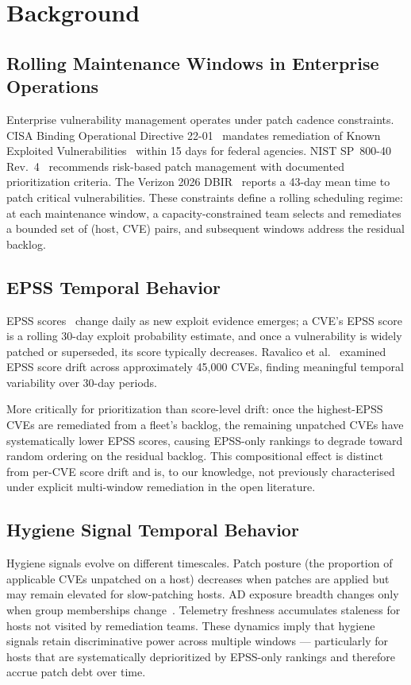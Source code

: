\section{Background}

\subsection{Rolling Maintenance Windows in Enterprise Operations}

Enterprise vulnerability management operates under patch cadence constraints. CISA Binding Operational Directive 22-01~\cite{cisa2021bod2201} mandates remediation of Known Exploited Vulnerabilities~\cite{cisa2026kev} within 15 days for federal agencies. NIST SP~800-40 Rev.~4~\cite{nist2022sp80040r4} recommends risk-based patch management with documented prioritization criteria. The Verizon 2026 DBIR~\cite{verizon2026dbir} reports a 43-day mean time to patch critical vulnerabilities. These constraints define a rolling scheduling regime: at each maintenance window, a capacity-constrained team selects and remediates a bounded set of (host, CVE) pairs, and subsequent windows address the residual backlog.

\subsection{EPSS Temporal Behavior}

EPSS scores~\cite{jacobs2021epss} change daily as new exploit evidence emerges; a CVE's EPSS score is a rolling 30-day exploit probability estimate, and once a vulnerability is widely patched or superseded, its score typically decreases. Ravalico et al.~\cite{ravalico2025epsstemporal} examined EPSS score drift across approximately 45{,}000 CVEs, finding meaningful temporal variability over 30-day periods.

More critically for prioritization than score-level drift: once the highest-EPSS CVEs are remediated from a fleet's backlog, the remaining unpatched CVEs have systematically lower EPSS scores, causing EPSS-only rankings to degrade toward random ordering on the residual backlog. This compositional effect is distinct from per-CVE score drift and is, to our knowledge, not previously characterised under explicit multi-window remediation in the open literature.

\subsection{Hygiene Signal Temporal Behavior}

Hygiene signals evolve on different timescales. Patch posture (the proportion of applicable CVEs unpatched on a host) decreases when patches are applied but may remain elevated for slow-patching hosts. AD exposure breadth changes only when group memberships change~\cite{cisa2022bod2301}. Telemetry freshness accumulates staleness for hosts not visited by remediation teams. These dynamics imply that hygiene signals retain discriminative power across multiple windows --- particularly for hosts that are systematically deprioritized by EPSS-only rankings and therefore accrue patch debt over time.
